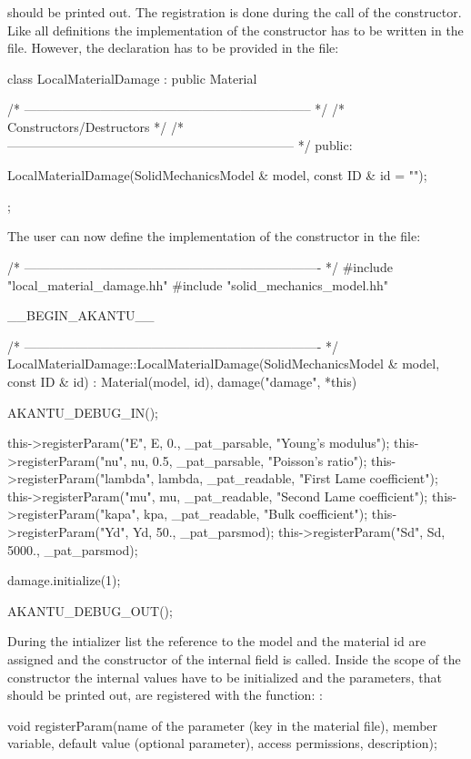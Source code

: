should be printed out. The registration is done during the call of the
constructor. Like all definitions the implementation of the
constructor has to be written in the 
file. However, the declaration has to be provided in the
 file:
\begin{cpp}
class LocalMaterialDamage : public Material {
  /* -------------------------------------------------------------------- */
  /* Constructors/Destructors                                             */
  /* -------------------------------------------------------------------- */
public:

  LocalMaterialDamage(SolidMechanicsModel & model, const ID & id = "");
};
\end{cpp}
The user can now define the implementation of the constructor in the
 file:
\begin{cpp}
/* ---------------------------------------------------------------------- */
#include "local_material_damage.hh"
#include "solid_mechanics_model.hh"

__BEGIN_AKANTU__

/* ---------------------------------------------------------------------- */
LocalMaterialDamage::LocalMaterialDamage(SolidMechanicsModel & model,
					 const ID & id)  :
  Material(model, id),
  damage("damage", *this) {
  AKANTU_DEBUG_IN();

  this->registerParam("E", E, 0., _pat_parsable, "Young's modulus");
  this->registerParam("nu", nu, 0.5, _pat_parsable, "Poisson's ratio");
  this->registerParam("lambda", lambda, _pat_readable, "First Lame coefficient");
  this->registerParam("mu", mu, _pat_readable, "Second Lame coefficient");
  this->registerParam("kapa", kpa, _pat_readable, "Bulk coefficient");
  this->registerParam("Yd", Yd,   50., _pat_parsmod);
  this->registerParam("Sd", Sd, 5000., _pat_parsmod);

  damage.initialize(1);

  AKANTU_DEBUG_OUT();
}
\end{cpp}
During the intializer list the reference to the model and the material id are assigned and the constructor of the internal field is called. Inside the scope of the constructor the internal values have to be initialized and the parameters, that should be printed out,  are registered with the function:
:
\begin{cpp}
void registerParam(name of the parameter (key in the material file),
                   member variable,
                   default value (optional parameter),
                   access permissions,
                   description);
\end{cpp}
